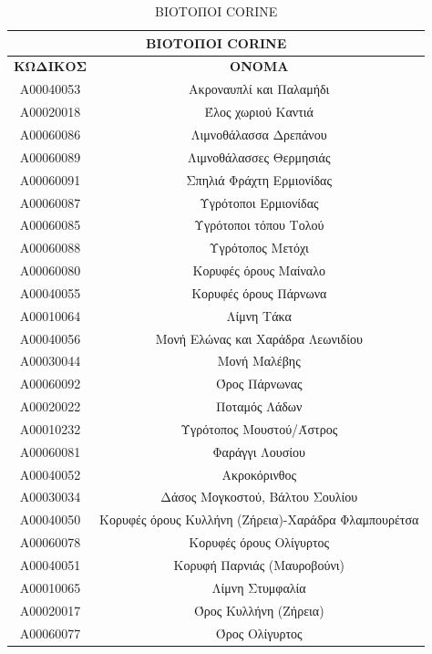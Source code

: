 \documentclass[12pt]{article}
\newcommand{\gr}{\selectlanguage{greek}}
\newcommand{\eng}{\selectlanguage{english}}
\begin{document}
	\begin{table}[H]
		\centering
		\begin{tabular}{|c|c|}
			\hline
			\multicolumn{2}{|c|}{\textbf{ΒΙΟΤΟΠΟΙ \eng CORINE \gr}} \\ \hline
			\textbf{ΚΩΔΙΚΟΣ} & \textbf{ΟΝΟΜΑ} \\ \hline
			A00040053 & Ακροναυπλί και Παλαμήδι \\ \hline
			A00020018 & Έλος χωριού Καντιά \\ \hline
			Α00060086 & Λιμνοθάλασσα Δρεπάνου \\ \hline
			Α00060089 & Λιμνοθάλασσες Θερμησιάς \\ \hline
			Α00060091 & Σπηλιά Φράχτη Ερμιονίδας \\ \hline
			Α00060087 & Υγρότοποι Ερμιονίδας \\ \hline
			Α00060085 & Υγρότοποι τόπου Τολού \\ \hline
			Α00060088 & Υγρότοπος Μετόχι \\ \hline
			Α00060080 & Κορυφές όρους Μαίναλο \\ \hline
			Α00040055 & Κορυφές όρους Πάρνωνα \\ \hline
			Α00010064 & Λίμνη Τάκα \\ \hline
			Α00040056 & Μονή Ελώνας και Χαράδρα Λεωνιδίου \\ \hline
			Α00030044 & Μονή Μαλέβης \\ \hline
			Α00060092 & Όρος Πάρνωνας \\ \hline
			Α00020022 & Ποταμός Λάδων \\ \hline
			Α00010232 & Υγρότοπος Μουστού/Άστρος \\ \hline
			Α00060081 & Φαράγγι Λουσίου \\ \hline
			Α00040052 & Ακροκόρινθος \\ \hline
			Α00030034 & Δάσος Μογκοστού, Βάλτου Σουλίου \\ \hline
			Α00040050 & Κορυφές όρους Κυλλήνη (Ζήρεια)-Χαράδρα Φλαμπουρέτσα \\ \hline
			Α00060078 & Κορυφές όρους Ολίγυρτος \\ \hline
			Α00040051 & Κορυφή Παρνιάς (Μαυροβούνι) \\ \hline
			Α00010065 & Λίμνη Στυμφαλία \\ \hline
			Α00020017 & Όρος Κυλλήνη (Ζήρεια) \\ \hline
			Α00060077 & Όρος Ολίγυρτος \\ \hline
		\end{tabular}
		\caption{ΒΙΟΤΟΠΟΙ \eng CORINE \gr}
		\label{The label}
	\end{table}
	
\end{document}
